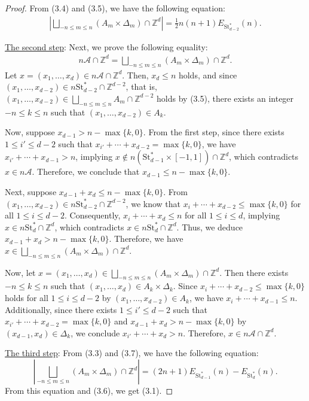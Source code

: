 \documentclass[10pt,a4paper]{amsart}
\newcommand{\Ac}{\mathcal{A}}
\newcommand{\ZZ}{\mathbb{Z}}
\begin{document}
\begin{proof}
From (3.4) and (3.5), we have the following equation:
\begin{align}
  \left|\bigsqcup_{-n \leq m \leq n}(A_m \times \Delta_m) \cap \ZZ^d \right| = \frac{1}{2}n(n+1)E_{\mathrm{St}_{d-2}^\ast}(n).
\end{align}

\smallskip

\noindent
\underline{The second step}: Next, we prove the following equality:
\begin{align}
  n\Ac \cap \ZZ^d = \bigsqcup_{-n \leq m \leq n}(A_m \times \Delta_m) \cap \ZZ^d.
\end{align}
Let $x = (x_1, \ldots, x_d) \in n\Ac \cap \ZZ^d$. Then, $x_d \leq n$ holds, and since $(x_1, \ldots, x_{d-2}) \in n\mathrm{St}_{d-2}^\ast \cap \ZZ^{d-2}$, that is, $(x_1, \ldots, x_{d-2}) \in \bigsqcup_{-n \leq m \leq n}A_m \cap \ZZ^{d-2}$ holds by (3.5), there exists an integer $-n \leq k \leq n$ such that $(x_1, \ldots, x_{d-2}) \in A_k$. 

Now, suppose $x_{d-1} > n-\max\{k, 0\}$. From the first step, since there exists $1 \leq i' \leq d-2$ such that $x_{i'} + \cdots + x_{d-2} = \max\{k, 0\}$, we have $x_{i'} + \cdots + x_{d-1} > n$, implying $x \notin n(\mathrm{St}_{d-1}^\ast \times [-1, 1]) \cap \ZZ^d$, which contradicts $x \in n\Ac$. Therefore, we conclude that $x_{d-1} \leq n-\max\{k, 0\}$. 

Next, suppose $x_{d-1}+x_d \leq n-\max\{k, 0\}$. From $(x_1, \ldots, x_{d-2}) \in n\mathrm{St}_{d-2}^\ast \cap \ZZ^{d-2}$, we know that $x_{i} + \cdots + x_{d-2} \leq \max\{k, 0\}$ for all $1 \leq i \leq d-2$. Consequently, $x_{i} + \cdots + x_d \leq n$ for all $1 \leq i \leq d$, implying $x \in n\mathrm{St}_d^\ast\cap \ZZ^d$, which contradicts $x \in n\mathrm{St}_d^\ast \cap \ZZ^d$. Thus, we deduce $x_{d-1}+x_d > n-\max\{k, 0\}$.
Therefore, we have $x \in \bigsqcup_{-n \leq m \leq n}(A_m \times \Delta_m) \cap \ZZ^d$.

Now, let $x = (x_1, \ldots, x_d) \in \bigsqcup_{-n \leq m \leq n}(A_m \times \Delta_m) \cap \ZZ^d$. Then there exists $-n \leq k \leq n$ such that $(x_1, \ldots, x_d) \in A_k \times \Delta_k$. Since $x_i + \cdots + x_{d-2} \leq \max\{k, 0\}$ holds for all $1 \leq i \leq d-2$ by $(x_1, \ldots, x_{d-2}) \in A_k$, we have $x_i + \cdots + x_{d-1} \leq n$. 
Additionally, since there exists $1 \leq i' \leq d-2$ such that $x_{i'} + \cdots + x_{d-2} = \max\{k, 0\}$ and $x_{d-1} + x_d > n-\max\{k, 0\}$ by $(x_{d-1}, x_d) \in \Delta_k$, we conclude $x_{i'} + \cdots + x_d > n$. Therefore, $x \in n\Ac \cap \ZZ^d$.

\smallskip

\noindent
\underline{The third step}: From (3.3) and (3.7), we have the following equation:
$$\left| \bigsqcup_{-n \leq m \leq n}(A_m \times \Delta_m) \cap \ZZ^d \right|= (2n+1)E_{\mathrm{St}_{d-1}^\ast}(n) - E_{\mathrm{St}_d^\ast}(n).$$
From this equation and (3.6), we get (3.1).
\end{proof}
\end{document}
